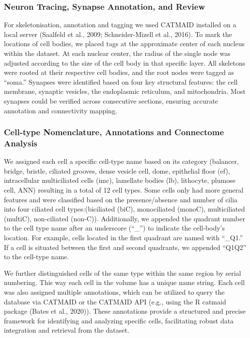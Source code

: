 \documentclass[
  11pt,
]{article}
\begin{document}
\subsubsection{Neuron Tracing, Synapse Annotation, and
Review}\label{neuron-tracing-synapse-annotation-and-review}

For skeletonisation, annotation and tagging we used CATMAID installed on
a local server (Saalfeld et al., 2009; Schneider-Mizell et al., 2016).
To mark the locations of cell bodies, we placed tags at the approximate
center of each nucleus within the dataset. At each nuclear center, the
radius of the single node was adjusted according to the size of the cell
body in that specific layer. All skeletons were rooted at their
respective cell bodies, and the root nodes were tagged as ``soma.''
Synapses were identified based on four key structural features: the cell
membrane, synaptic vesicles, the endoplasmic reticulum, and
mitochondria. Most synapses could be verified across consecutive
sections, ensuring accurate annotation and connectivity mapping.

\subsubsection{Cell-type Nomenclature, Annotations and Connectome
Analysis}\label{cell-type-nomenclature-annotations-and-connectome-analysis}

We assigned each cell a specific cell-type name based on its category
(balancer, bridge, bristle, ciliated grooves, dense vesicle cell, dome,
epithelial floor (ef), intracellular multiciliated cells (imc),
lamellate bodies (lb), lithocyte, plumose cell, ANN) resulting in a
total of 12 cell types. Some cells only had more general features and
were classified based on the presence/absence and number of cilia into
four ciliated cell types:(biciliated (biC), monociliated (monoC),
multiciliated (multiC), non-ciliated (non-C)). Additionally, we appended
the quadrant number to the cell type name after an underscore (``\_'')
to indicate the cell-body's location. For example, cells located in the
first quadrant are named with ``\_Q1.'' If a cell is situated between
the first and second quadrants, we appended ``Q1Q2'' to the cell-type
name.

We further distinguished cells of the same type within the same region
by serial numbering. This way each cell in the volume has a unique name
string. Each cell was also assigned multiple annotations, which can be
utilized to query the database via CATMAID or the CATMAID API (e.g.,
using the R catmaid package (Bates et al., 2020)). These annotations
provide a structured and precise framework for identifying and analyzing
specific cells, facilitating robust data integration and retrieval from
the dataset.
\end{document}
